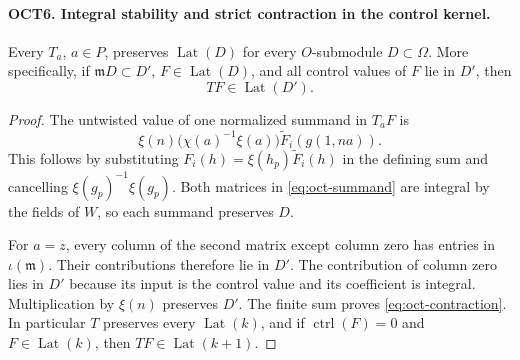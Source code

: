 \documentclass[11pt,a4paper]{article}
\numberwithin{equation}{section}
\theoremstyle{remark}\newtheorem{remark}[theorem]{Remark}
\begin{document}
\paragraph{OCT6. Integral stability and strict contraction in the control kernel.}
\label{claim:OCT6}
Every $T_a$, $a\in P$, preserves $\operatorname{Lat}(D)$ for
every $O$-submodule $D\subset\Omega$.  More specifically, if
$\mathfrak m D\subset D'$, $F\in\operatorname{Lat}(D)$, and
all control values of $F$ lie in $D'$, then
\begin{equation}\label{eq:oct-contraction}
                         TF\in\operatorname{Lat}(D').
\end{equation}
\begin{proof}
The untwisted value of one normalized summand in $T_aF$ is
\begin{equation}\label{eq:oct-summand}
 \xi(n)\bigl(\chi(a)^{-1}\xi(a)\bigr)
                         \widetilde F_i(g(1,\allowbreak{} na)).
\end{equation}
This follows by substituting
$F_i(h)=\xi(h_p)\widetilde F_i(h)$ in the defining sum and
cancelling $\xi(g_p)^{-1}\xi(g_p)$.  Both matrices in
\eqref{eq:oct-summand} are integral by the fields of $W$, so
each summand preserves $D$.

For $a=z$, every column of the second matrix except column
zero has entries in $\iota(\mathfrak m)$.  Their contributions
therefore lie in $D'$.  The contribution of column zero lies
in $D'$ because its input is the control value and its
coefficient is integral.  Multiplication by $\xi(n)$ preserves
$D'$.  The finite sum proves \eqref{eq:oct-contraction}.
In particular $T$ preserves every $\operatorname{Lat}(k)$, and
if $\operatorname{ctrl}(F)=0$ and
$F\in\operatorname{Lat}(k)$, then
$TF\in\operatorname{Lat}(k+1)$.
\end{proof}

\end{document}
